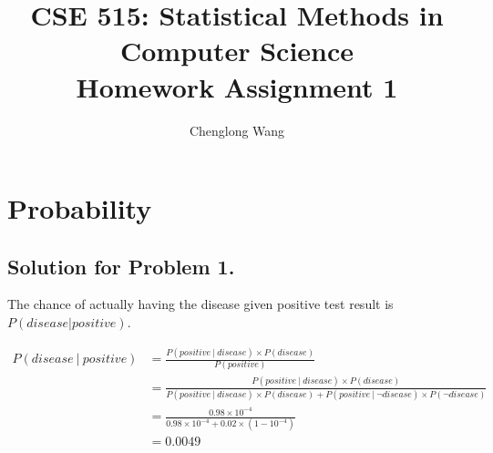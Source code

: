 \documentclass[notitlepage]{article}
\date{}
\title{{\large CSE 515: Statistical Methods in Computer Science}\\ Homework Assignment 1}
\author{Chenglong Wang}
\begin{document}
\maketitle

\section{Probability}

\subsection*{Solution for Problem 1.}
The chance of actually having the disease given positive test result is $P(\mathit{disease}|\mathit{positive})$. 

\begin{align*}
P(\mathit{disease}~|~\mathit{positive}) &= \frac{P(\mathit{positive}~|~\mathit{disease})\times P(\mathit{disease})}{P(\mathit{positive})}\\
&= \frac{P(\mathit{positive}~|~\mathit{disease})\times P(\mathit{disease})}{P(\mathit{positive}~|~\mathit{disease})\times P(\mathit{disease}) + P(\mathit{positive}~|~\neg\mathit{disease})\times P(\neg\mathit{disease})}\\
&=\frac{0.98 \times 10^{-4}}{0.98 \times 10^{-4} + 0.02 \times (1-10^{-4})}\\
&=0.0049\\
\end{align*} 
\end{document}
